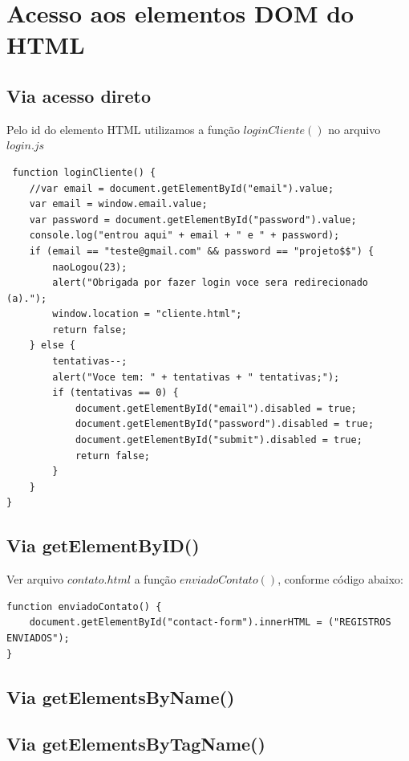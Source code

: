 \section{Acesso aos elementos DOM do HTML }
\subsection{Via acesso direto}

 Pelo id do elemento HTML utilizamos a função $loginCliente()$ no arquivo $login.js$
 \begin{lstlisting}
 function loginCliente() {
    //var email = document.getElementById("email").value;
    var email = window.email.value;
    var password = document.getElementById("password").value;
    console.log("entrou aqui" + email + " e " + password);
    if (email == "teste@gmail.com" && password == "projeto$$") {
        naoLogou(23);
        alert("Obrigada por fazer login voce sera redirecionado (a).");
        window.location = "cliente.html";
        return false;
    } else {
        tentativas--;
        alert("Voce tem: " + tentativas + " tentativas;");
        if (tentativas == 0) {
            document.getElementById("email").disabled = true;
            document.getElementById("password").disabled = true;
            document.getElementById("submit").disabled = true;
            return false;
        }
    }
}
 \end{lstlisting}

\subsection{Via getElementByID()}
	Ver arquivo $contato.html$ a função $enviadoContato()$, conforme código abaixo:
	
\begin{lstlisting}
function enviadoContato() {
    document.getElementById("contact-form").innerHTML = ("REGISTROS ENVIADOS");
}
\end{lstlisting}

\subsection{Via getElementsByName()}



\subsection{Via getElementsByTagName()}



